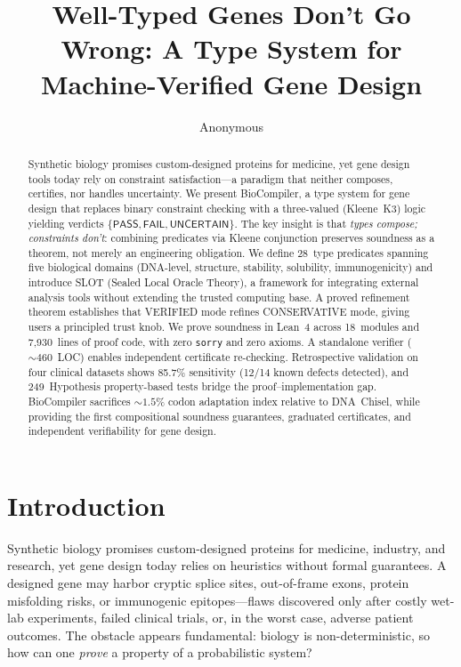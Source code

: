 \documentclass[acmsmall,review,anonymous]{acmart}
\title{Well-Typed Genes Don't Go Wrong: A Type System for Machine-Verified Gene Design}
\author{Anonymous}
\institute{Anonymous Institution}
\newcommand{\PASS}{\ensuremath{\mathsf{PASS}}\xspace}
\newcommand{\FAIL}{\ensuremath{\mathsf{FAIL}}\xspace}
\newcommand{\UNCERTAIN}{\ensuremath{\mathsf{UNCERTAIN}}\xspace}
\begin{document}
\maketitle

\begin{abstract}
Synthetic biology promises custom-designed proteins for medicine, yet gene design tools today rely on constraint satisfaction---a paradigm that neither composes, certifies, nor handles uncertainty. We present BioCompiler, a type system for gene design that replaces binary constraint checking with a three-valued (Kleene~K3) logic yielding verdicts $\{\PASS, \FAIL, \UNCERTAIN\}$. The key insight is that \emph{types compose; constraints don't}: combining predicates via Kleene conjunction preserves soundness as a theorem, not merely an engineering obligation. We define 28~type predicates spanning five biological domains (DNA-level, structure, stability, solubility, immunogenicity) and introduce SLOT (Sealed Local Oracle Theory), a framework for integrating external analysis tools without extending the trusted computing base. A proved refinement theorem establishes that VERIFIED mode refines CONSERVATIVE mode, giving users a principled trust knob. We prove soundness in Lean~4 across 18~modules and 7,930~lines of proof code, with zero \texttt{sorry} and zero axioms. A standalone verifier (${\sim}460$~LOC) enables independent certificate re-checking. Retrospective validation on four clinical datasets shows 85.7\% sensitivity (12/14 known defects detected), and 249~Hypothesis property-based tests bridge the proof--implementation gap. BioCompiler sacrifices ${\sim}1.5\%$ codon adaptation index relative to DNA~Chisel, while providing the first compositional soundness guarantees, graduated certificates, and independent verifiability for gene design.
\end{abstract}
\section{Introduction}\label{sec:intro}

Synthetic biology promises custom-designed proteins for medicine,
industry, and research, yet gene design today relies on heuristics
without formal guarantees.
A designed gene may harbor cryptic splice sites, out-of-frame exons,
protein misfolding risks, or immunogenic epitopes---flaws discovered
only after costly wet-lab experiments, failed clinical trials, or, in
the worst case, adverse patient outcomes.
The obstacle appears fundamental: biology is non-deterministic, so how
can one \emph{prove} a property of a probabilistic system?
\end{document}
